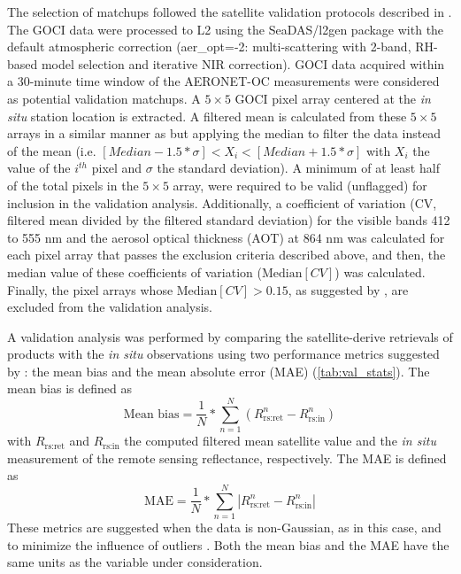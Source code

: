 \documentclass[]{interact}
\theoremstyle{plain}%
\theoremstyle{definition}
\theoremstyle{remark}
\begin{document}
The selection of matchups followed the satellite validation protocols described in \citep{Bailey2006}. Th{}e GOCI data were processed to L2 using the SeaDAS/l2gen package with the default atmospheric correction (aer\_opt=-2: multi-scattering with 2-band, RH-based model selection and iterative NIR correction). GOCI data acquired within a 30-minute time window of the AERONET-OC measurements were considered as potential validation matchups. A $5\times5$ GOCI pixel array centered at the {\it in situ} station location is extracted. A filtered mean is calculated from these $5\times5$ arrays in a similar manner as \citep{Bailey2006} but applying the median to filter the data instead of the mean (i.e. $[Median-1.5*\sigma] <  X_i < [Median+1.5*\sigma]$ with $X_i$ the value of the $i^{th}$ pixel and $\sigma$ the standard deviation). A minimum of at least half of the total pixels in the $5\times5$ array, were required to be valid (unflagged) for inclusion in the validation analysis. Additionally, a coefficient of variation (CV, filtered mean divided by the filtered standard deviation) for the visible bands 412 to 555 nm and the aerosol optical thickness (AOT) at 864 nm was calculated for each pixel array that passes the exclusion criteria described above, and then, the median value of these coefficients of variation ($\text{Median}[CV]$) was calculated. Finally, the pixel arrays whose $\text{Median}[CV]>0.15$, as suggested by \citep{Bailey2006}, are excluded from the validation analysis.

A validation analysis was performed by comparing the satellite-derive retrievals of products with the {\it in situ} observations using two performance metrics suggested by  \citep{Seegers:18}: the mean bias and the mean absolute error (MAE) (\autoref{tab:val_stats}). The mean bias is defined as 
\begin{equation}
    \text{Mean bias} = \frac{1}{N}*\sum_{n=1}^N(R_\text{rs:ret}^n-R_\text{rs:in}^n)
\end{equation}
with $R_\text{rs:ret}$ and $R_\text{rs:in}$ the computed filtered mean satellite value and the {\it in situ} measurement of the remote sensing reflectance, respectively. The MAE is defined as 
\begin{equation}
    \text{MAE} = \frac{1}{N}*\sum_{n=1}^N\left|R_\text{rs:ret}^n-R_\text{rs:in}^n\right|
\end{equation}
These metrics are suggested when the data is non-Gaussian, as in this case, and to minimize the influence of outliers \citep{Seegers:18}. Both the mean bias and the MAE have the same units as the variable under consideration. 
\end{document}
